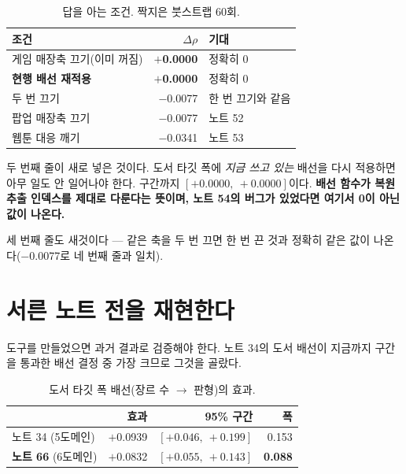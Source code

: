 \documentclass[10pt]{article}
\begin{document}
\begin{table}[t]
\centering\tsize
\caption{답을 아는 조건. 짝지은 붓스트랩 60회.}
\begin{tabular}{lrl}
\toprule
조건 & $\Delta\rho$ & 기대 \\
\midrule
게임 매장축 끄기(이미 꺼짐) & \textbf{$+$0.0000} & 정확히 0 \\
\textbf{현행 배선 재적용} & \textbf{$+$0.0000} & 정확히 0 \\
두 번 끄기 & $-$0.0077 & 한 번 끄기와 같음 \\
팝업 매장축 끄기 & $-$0.0077 & 노트 52 \\
웹툰 대응 깨기 & $-$0.0341 & 노트 53 \\
\bottomrule
\end{tabular}
\end{table}

두 번째 줄이 새로 넣은 것이다. 도서 타깃 폭에 \emph{지금 쓰고 있는} 배선을
다시 적용하면 아무 일도 안 일어나야 한다. 구간까지 $[+0.0000,\ +0.0000]$이다.
\textbf{배선 함수가 복원추출 인덱스를 제대로 다룬다는 뜻이며, 노트 54의 버그가
있었다면 여기서 0이 아닌 값이 나온다.}

세 번째 줄도 새것이다 --- 같은 축을 두 번 끄면 한 번 끈 것과 정확히 같은 값이
나온다($-$0.0077로 네 번째 줄과 일치).

\section{서른 노트 전을 재현한다}

도구를 만들었으면 과거 결과로 검증해야 한다. 노트 34의 도서 배선이 지금까지
구간을 통과한 배선 결정 중 가장 크므로 그것을 골랐다.

\begin{table}[t]
\centering\tsize
\caption{도서 타깃 폭 배선(장르 수 $\to$ 판형)의 효과.}
\begin{tabular}{lrrr}
\toprule
& 효과 & 95\% 구간 & 폭 \\
\midrule
노트 34 (5도메인) & $+$0.0939 & $[+0.046,\ +0.199]$ & 0.153 \\
\textbf{노트 66} (6도메인) & $+$0.0832 & $[+0.055,\ +0.143]$ & \textbf{0.088} \\
\bottomrule
\end{tabular}
\end{table}

\end{document}
